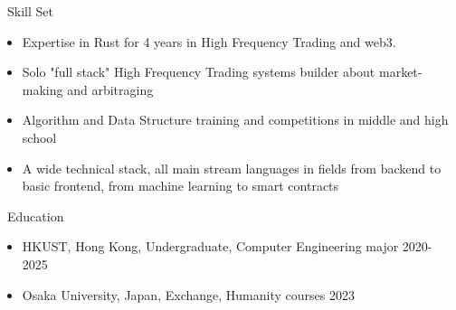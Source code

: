\documentclass{resume}
\begin{document}

\begin{rSection}{\faCogs~Skill Set}
    \begin{itemize}
        \itemsep -0.5em
        \item Expertise in Rust for 4 years in High Frequency Trading and web3.
        \item Solo "full stack" High Frequency Trading systems builder about market-making and arbitraging
        \item Algorithm and Data Structure training and competitions in middle and high school
        \item A wide technical stack, all main stream languages in fields from backend to basic frontend, from machine learning to smart contracts 
    \end{itemize}
    
\end{rSection}

\begin{rSection}{\faGraduationCap~Education}
    \begin{itemize}
        \item HKUST, Hong Kong, Undergraduate, Computer Engineering major \hfill 2020-2025
        \item Osaka University, Japan, Exchange, Humanity courses \hfill 2023 
    \end{itemize}
\end{rSection}
\end{document}
